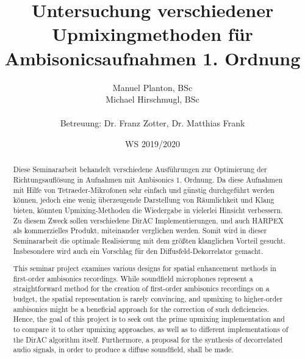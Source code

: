\documentclass[12pt, a4paper]{article}
\begin{document}

\title{Untersuchung verschiedener Upmixingmethoden für Ambisonicsaufnahmen 1. Ordnung}

\author{Manuel Planton, BSc \\ Michael Hirschmugl, BSc\\\\\small{Betreuung: Dr. Franz Zotter, Dr. Matthias Frank}}



\date{WS 2019/2020}

\maketitle
\newpage
\pagestyle{empty}
\hspace{1cm}\vspace{3cm}

\hspace{1cm}\vspace{1cm}

\begin{abstract}
   Diese Seminararbeit behandelt verschiedene Ausführungen zur Optimierung der Richtungsauflösung in Aufnahmen mit Ambisonics 1. Ordnung. Da diese Aufnahmen mit Hilfe von Tetraeder-Mikrofonen sehr einfach und günstig durchgeführt werden können, jedoch eine wenig überzeugende Darstellung von Räumlichkeit und Klang bieten, könnten Upmixing-Methoden die Wiedergabe in vielerlei Hinsicht verbessern.
   Zu diesem Zweck sollen verschiedene DirAC Implementierungen, und auch HARPEX als kommerzielles Produkt, miteinander verglichen werden. Somit wird in dieser Seminararbeit die optimale Realisierung mit dem größten klanglichen Vorteil gesucht. Insbesondere wird auch ein Vorschlag für den Diffusfeld-Dekorrelator gemacht.
\end{abstract}
\begin{abstract}
   This seminar project examines various designs for spatial enhancement methods in first-order ambisonics recordings. While soundfield microphones represent a straightforward method for the creation of first-order ambisonics recordings on a budget, the spatial representation is rarely convincing, and upmixing to higher-order ambisonics might be a beneficial approach for the correction of such deficiencies.
   Hence, the goal of this project is to seek out the prime upmixing implementation and to compare it to other upmixing approaches, as well as to different implementations of the DirAC algorithm itself. Furthermore, a proposal for the synthesis of decorrelated audio signals, in order to produce a diffuse soundfield, shall be made.
\end{abstract}
\newpage
\pagestyle{myheadings}
\hspace{1cm}\vspace{2cm}
\end{document}
